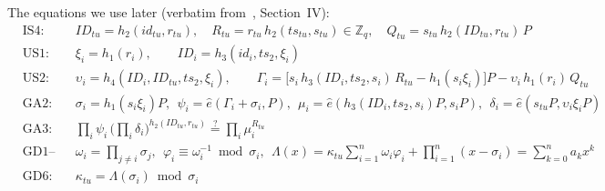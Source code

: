 \noindent The equations we use later (verbatim from~\cite{base}, Section~IV):
\begin{align}
  &\text{IS4:} && ID_{tu}=h_2(id_{tu},r_{tu}),\quad R_{tu}=r_{tu}\,h_2(ts_{tu},s_{tu})\in\mathbb{Z}_q,\quad Q_{tu}=s_{tu}\,h_2(ID_{tu},r_{tu})\,P \label{eq:is4}\\
  &\text{US1:} && \xi_i=h_1(r_i),\qquad ID_i=h_3(id_i,ts_2,\xi_i)\\
  &\text{US2:} && \upsilon_i=h_4(ID_i,ID_{tu},ts_2,\xi_i),\qquad
     \Gamma_i=\big[s_i\,h_3(ID_i,ts_2,s_i)\,R_{tu}-h_1(s_i\xi_i)\big]P-\upsilon_i\,h_1(r_i)\,Q_{tu} \label{eq:gamma}\\
  &\text{GA2:} && \sigma_i=h_1(s_i\xi_i)P,\ \ \psi_i=\hat e(\Gamma_i+\sigma_i,P),\ \ \mu_i=\hat e(h_3(ID_i,ts_2,s_i)P,s_iP),\ \ \delta_i=\hat e(s_{tu}P,\upsilon_i\xi_iP)\\
  &\text{GA3:} && \textstyle\prod_{i}\psi_i\,\big(\prod_i\delta_i\big)^{h_2(ID_{tu},r_{tu})}\overset{?}{=}\prod_i\mu_i^{R_{tu}}\label{eq:ga3}\\
  &\text{GD1--2:} && \omega_i=\textstyle\prod_{j\ne i}\sigma_j,\ \ \varphi_i\equiv\omega_i^{-1}\bmod\sigma_i,\ \
     \Lambda(x)=\kappa_{tu}\sum_{i=1}^{n}\omega_i\varphi_i+\prod_{i=1}^{n}(x-\sigma_i)=\sum_{k=0}^{n}a_kx^k \label{eq:lambda}\\
  &\text{GD6:} && \kappa_{tu}=\Lambda(\sigma_i)\bmod\sigma_i
\end{align}
